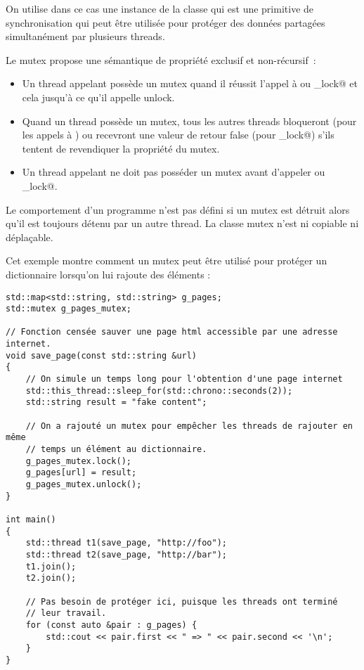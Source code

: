 \documentclass[fleqn,11pt]{article}
\begin{document}
On utilise dans ce cas une instance de la classe \lstinline@mutex@ qui est une primitive de synchronisation qui peut être utilisée pour protéger des données partagées simultanément par plusieurs threads.

Le mutex propose une sémantique de propriété exclusif et non-récursif~:

\begin{itemize}
\item Un thread appelant possède un mutex quand il réussit l'appel à 
\lstinline@lock@ ou \lstinline@try_lock@ et cela jusqu'à ce qu'il appelle unlock.
\item Quand un thread possède un mutex, tous les autres threads bloqueront (pour les appels à \lstinline@lock@) ou  recevront une valeur de retour false (pour \lstinline@try_lock@) s'ils tentent de revendiquer la propriété du mutex.
\item Un thread appelant ne doit pas posséder un mutex avant d'appeler \lstinline@lock@ ou \lstinline@try_lock@.
\end{itemize}

Le comportement d'un programme n'est pas défini si un mutex est détruit alors qu'il est toujours détenu par un autre thread. La classe mutex n'est ni copiable ni déplaçable.

Cet exemple montre comment un mutex peut être utilisé pour protéger un dictionnaire lorsqu'on lui rajoute 
des éléments :

\begin{lstlisting}
std::map<std::string, std::string> g_pages;
std::mutex g_pages_mutex;

// Fonction censée sauver une page html accessible par une adresse internet. 
void save_page(const std::string &url)
{
    // On simule un temps long pour l'obtention d'une page internet
    std::this_thread::sleep_for(std::chrono::seconds(2));
    std::string result = "fake content";
 
    // On a rajouté un mutex pour empêcher les threads de rajouter en même
    // temps un élément au dictionnaire.
    g_pages_mutex.lock();
    g_pages[url] = result;
    g_pages_mutex.unlock();
}
 
int main() 
{
    std::thread t1(save_page, "http://foo");
    std::thread t2(save_page, "http://bar");
    t1.join();
    t2.join();

    // Pas besoin de protéger ici, puisque les threads ont terminé
    // leur travail. 
    for (const auto &pair : g_pages) {
        std::cout << pair.first << " => " << pair.second << '\n';
    }
}
\end{lstlisting}
\end{document}
